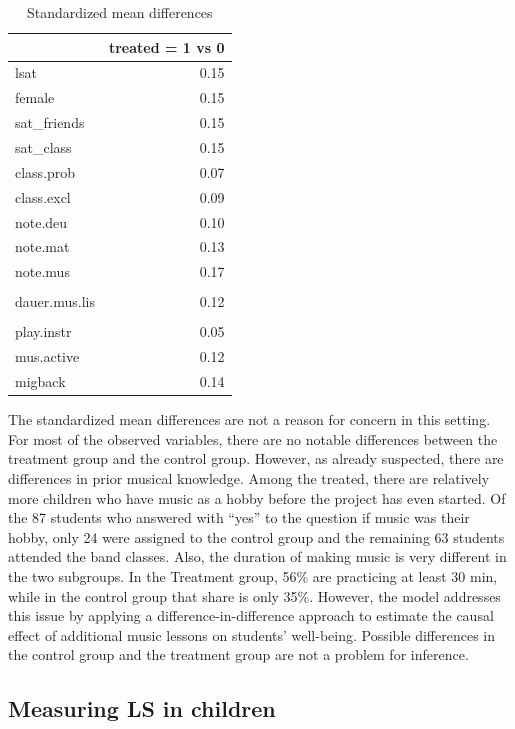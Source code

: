 \documentclass[a4, 12pt]{article}
\begin{document}
\begin{table}[H]

\caption{\label{tab:std-mean-diff}Standardized mean differences}
\centering
\begin{tabular}[t]{lr}
\toprule
  & treated = 1 vs 0\\
\midrule
lsat & 0.15\\
female & 0.15\\
sat\_friends & 0.15\\
sat\_class & 0.15\\
class.prob & 0.07\\
\addlinespace
class.excl & 0.09\\
note.deu & 0.10\\
note.mat & 0.13\\
note.mus & 0.17\\
\cellcolor[HTML]{b3cde0}{hob.mus.making} & \cellcolor[HTML]{b3cde0}{0.51}\\
\addlinespace
dauer.mus.lis & 0.12\\
\cellcolor[HTML]{b3cde0}{dauer.mus.making} & \cellcolor[HTML]{b3cde0}{0.42}\\
play.instr & 0.05\\
mus.active & 0.12\\
migback & 0.14\\
\bottomrule
\end{tabular}
\end{table}

The standardized mean differences are not a reason for concern in this setting. For most of the observed variables, there are no notable differences between the treatment group and the control group. However, as already suspected, there are differences in prior musical knowledge. Among the treated, there are relatively more children who have music as a hobby before the project has even started. Of the 87 students who answered with ``yes'' to the question if music was their hobby, only 24 were assigned to the control group and the remaining 63 students attended the band classes. Also, the duration of making music is very different in the two subgroups. In the Treatment group, 56\% are practicing at least 30 min, while in the control group that share is only 35\%. However, the model addresses this issue by applying a difference-in-difference approach to estimate the causal effect of additional music lessons on students' well-being. Possible differences in the control group and the treatment group are not a problem for inference.

\hypertarget{measuring-ls-in-children}{%
\subsection{Measuring LS in children}\label{measuring-ls-in-children}}
\end{document}
